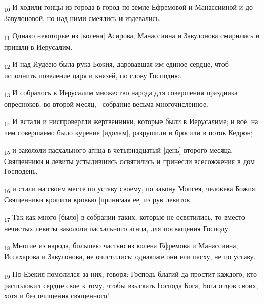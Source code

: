 \begin{tcolorbox}
\textsubscript{10} И ходили гонцы из города в город по земле Ефремовой и Манассииной и до Завулоновой, но над ними смеялись и издевались.
\end{tcolorbox}
\begin{tcolorbox}
\textsubscript{11} Однако некоторые из [колена] Асирова, Манассиина и Завулонова смирились и пришли в Иерусалим.
\end{tcolorbox}
\begin{tcolorbox}
\textsubscript{12} И над Иудеею была рука Божия, даровавшая им единое сердце, чтоб исполнить повеление царя и князей, по слову Господню.
\end{tcolorbox}
\begin{tcolorbox}
\textsubscript{13} И собралось в Иерусалим множество народа для совершения праздника опресноков, во второй месяц, --собрание весьма многочисленное.
\end{tcolorbox}
\begin{tcolorbox}
\textsubscript{14} И встали и ниспровергли жертвенники, которые были в Иерусалиме; и всё, на чем совершаемо было курение [идолам], разрушили и бросили в поток Кедрон;
\end{tcolorbox}
\begin{tcolorbox}
\textsubscript{15} и закололи пасхального агнца в четырнадцатый [день] второго месяца. Священники и левиты устыдившись освятились и принесли всесожжения в дом Господень,
\end{tcolorbox}
\begin{tcolorbox}
\textsubscript{16} и стали на своем месте по уставу своему, по закону Моисея, человека Божия. Священники кропили кровью [принимая ее] из рук левитов.
\end{tcolorbox}
\begin{tcolorbox}
\textsubscript{17} Так как много [было] в собрании таких, которые не освятились, то вместо нечистых левиты закололи пасхального агнца, для посвящения Господу.
\end{tcolorbox}
\begin{tcolorbox}
\textsubscript{18} Многие из народа, большею частью из колена Ефремова и Манассиина, Иссахарова и Завулонова, не очистились; однакоже они ели пасху, не по уставу.
\end{tcolorbox}
\begin{tcolorbox}
\textsubscript{19} Но Езекия помолился за них, говоря: Господь благий да простит каждого, кто расположил сердце свое к тому, чтобы взыскать Господа Бога, Бога отцов своих, хотя и без очищения священного!
\end{tcolorbox}
